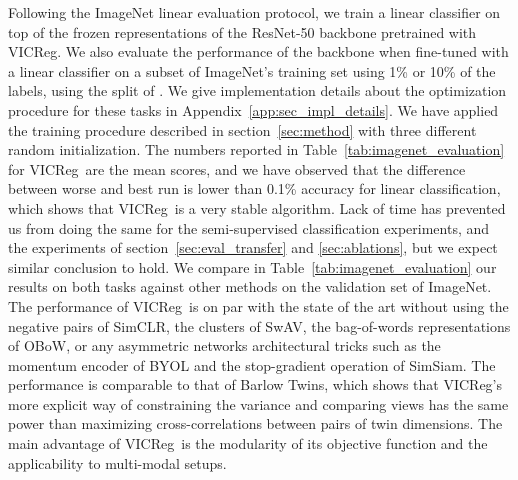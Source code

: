 \documentclass{article} %
\newcommand{\algo}{VICReg}
\begin{document}
Following the ImageNet \cite{deng2009imagenet} linear evaluation protocol, we train a linear classifier on top of the frozen representations of the ResNet-50 backbone pretrained with \algo. We also evaluate the performance of the backbone when fine-tuned with a linear classifier on a subset of ImageNet's training set using 1\% or 10\% of the labels, using the split of \cite{chen2020simclr}. We give implementation details about the optimization procedure for these tasks in Appendix~\ref{app:sec_impl_details}. We have applied the training procedure described in section~\ref{sec:method} with three different random initialization. The numbers reported in Table~\ref{tab:imagenet_evaluation} for \algo \ are the mean scores, and we have observed that the difference between worse and best run is lower than 0.1\% accuracy for linear classification, which shows that \algo \ is a very stable algorithm. Lack of time has prevented us from doing the same for the semi-supervised classification experiments, and the experiments of section~\ref{sec:eval_transfer} and \ref{sec:ablations}, but we expect similar conclusion to hold. We compare in Table~\ref{tab:imagenet_evaluation} our results on both tasks against other methods on the validation set of ImageNet. The performance of \algo \ is on par with the state of the art without using the negative pairs of SimCLR, the clusters of SwAV, the bag-of-words representations of OBoW, or any asymmetric networks architectural tricks such as the momentum encoder of BYOL and the stop-gradient operation of SimSiam. The performance is comparable to that of Barlow Twins, which shows that \algo's more explicit way of constraining the variance and comparing views has the same power than maximizing cross-correlations between pairs of twin dimensions. The main advantage of \algo \ is the modularity of its objective function and the applicability to multi-modal setups.
\end{document}
